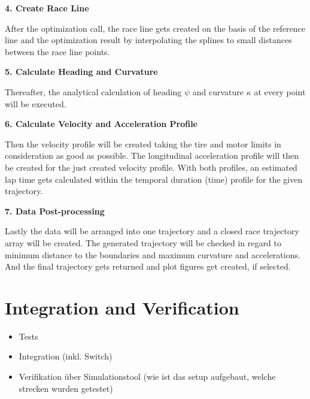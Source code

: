 \textbf{4. Create Race Line}

After the optimization call, the race line gets created on the basis of the reference line and the optimization result by interpolating the splines to small distances between the race line points.

\textbf{5. Calculate Heading and Curvature}

Thereafter, the analytical calculation of heading $\psi$ and curvature $\kappa$ at every point will be executed.

\textbf{6. Calculate Velocity and Acceleration Profile}

Then the velocity profile will be created taking the tire and motor limits in consideration as good as possible. The longitudinal acceleration profile will then be created for the just created velocity profile. With both profiles, an estimated lap time gets calculated within the temporal duration (time) profile for the given trajectory.

\textbf{7. Data Post-processing}

Lastly the data will be arranged into one trajectory and a closed race trajectory array will be created. The generated trajectory will be checked in regard to minimum distance to the boundaries and maximum curvature and accelerations. And the final trajectory gets returned and plot figures get created, if selected.

\section{Integration and Verification} \label{sec:Integration and Verification}

\begin{itemize}
    \item Tests
    \item Integration (inkl. Switch)
    \item Verifikation über Simulationstool (wie ist das setup aufgebaut, welche strecken wurden getestet)
\end{itemize}

